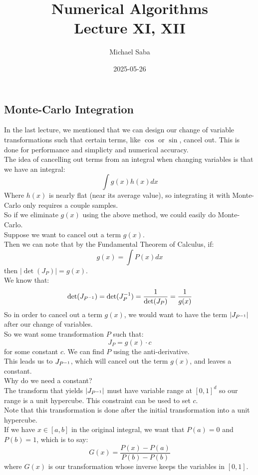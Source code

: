 \documentclass[12pt]{article}
\title{%
    \Huge Numerical Algorithms \\
    \Large Lecture XI, XII
}
\date{2025-05-26}
\author{Michael Saba}
\begin{document}
\maketitle
\newpage
\setlength{\parindent}{0pt}

\subsection*{Monte-Carlo Integration}

In the last lecture, we mentioned that
we can design our change of variable transformations
such that certain terms, like $\cos$
or $\sin$, cancel out.
This is done for performance and simplicty
and numerical accuracy. \\

The idea of cancelling out terms from
an integral when changing variables
is that we have an integral:
\[ \int g(x)h(x) dx \]
Where $h(x)$ is nearly flat (near its average
value), so integrating it with Monte-Carlo
only requires a couple samples. \\
So if we eliminate $g(x)$ using the above method,
we could easily do Monte-Carlo. \\

Suppose we want to cancel out a term 
$g(x)$. \\
Then we can note that by the Fundamental
Theorem of Calculus, if:
\[ g(x) = \int P(x) dx \]
then $|\det(J_P)| = g(x)$. \\
We know that:
\[ \det(J_{P^{-1}}) =  \det(J_{P}^{-1})
= \dfrac{1}{\det(J_{P})}
= \dfrac{1}{g(x)} \]
So in order to cancel out a term $g(x)$,
we would want to have the term
$|J_{P^{-1}}|$ after our change of variables. \\

So we want some transformation $P$ such that:
\[ J_{P} = g(x) \cdot c \]
for some constant $c$. 
We can find $P$ using the anti-derivative. \\
This leads us to $J_{P^{-1}}$, which
will cancel out the term $g(x)$,
and leaves a constant. \\

Why do we need a constant? \\
The transform that yields $|J_{P^{-1}}|$
must have variable range at $[0, 1]^d$
so our range is a unit hypercube.
This constraint can be used to set $c$. \\
Note that this transformation is done 
after the initial transformation into a 
unit hypercube. \\
If we have $x \in [a, b]$ in the original
integral, we want that $P(a) = 0$
and $P(b) = 1$,
which is to say:
\[ G(x) = \dfrac{P(x) - P(a)}{P(b) - P(b)} \]
where $G(x)$ is our transformation
whose inverse keeps the variables 
in $[0, 1]$. \\
\end{document}
